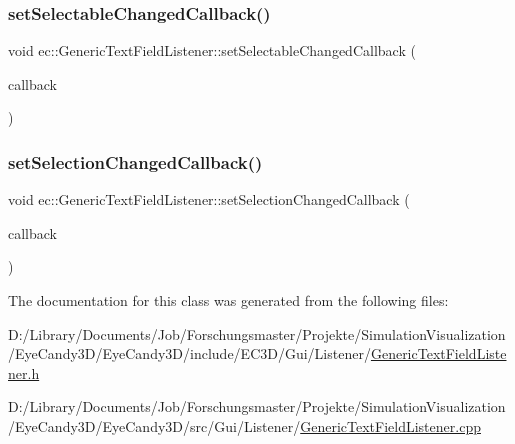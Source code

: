 \subsubsection{\texorpdfstring{set\+Selectable\+Changed\+Callback()}{setSelectableChangedCallback()}}
{\footnotesize\ttfamily void ec\+::\+Generic\+Text\+Field\+Listener\+::set\+Selectable\+Changed\+Callback (\begin{DoxyParamCaption}\item[{const \mbox{\hyperlink{classec_1_1_generic_text_field_listener_afa761f962b7fb681d7d9d29a132f800e}{Selectable\+Changed\+\_\+\+Callback}} \&}]{callback }\end{DoxyParamCaption})}

\mbox{\label{classec_1_1_generic_text_field_listener_aea5a7265627003b41e3a74744a1251d6}} 
\subsubsection{\texorpdfstring{set\+Selection\+Changed\+Callback()}{setSelectionChangedCallback()}}
{\footnotesize\ttfamily void ec\+::\+Generic\+Text\+Field\+Listener\+::set\+Selection\+Changed\+Callback (\begin{DoxyParamCaption}\item[{const \mbox{\hyperlink{classec_1_1_generic_text_field_listener_aa25985c5297422833dc4f5395562f238}{Selection\+Changed\+\_\+\+Callback}} \&}]{callback }\end{DoxyParamCaption})}



The documentation for this class was generated from the following files\+:\begin{DoxyCompactItemize}
\item 
D\+:/\+Library/\+Documents/\+Job/\+Forschungsmaster/\+Projekte/\+Simulation\+Visualization/\+Eye\+Candy3\+D/\+Eye\+Candy3\+D/include/\+E\+C3\+D/\+Gui/\+Listener/\mbox{\hyperlink{_generic_text_field_listener_8h}{Generic\+Text\+Field\+Listener.\+h}}\item 
D\+:/\+Library/\+Documents/\+Job/\+Forschungsmaster/\+Projekte/\+Simulation\+Visualization/\+Eye\+Candy3\+D/\+Eye\+Candy3\+D/src/\+Gui/\+Listener/\mbox{\hyperlink{_generic_text_field_listener_8cpp}{Generic\+Text\+Field\+Listener.\+cpp}}\end{DoxyCompactItemize}
